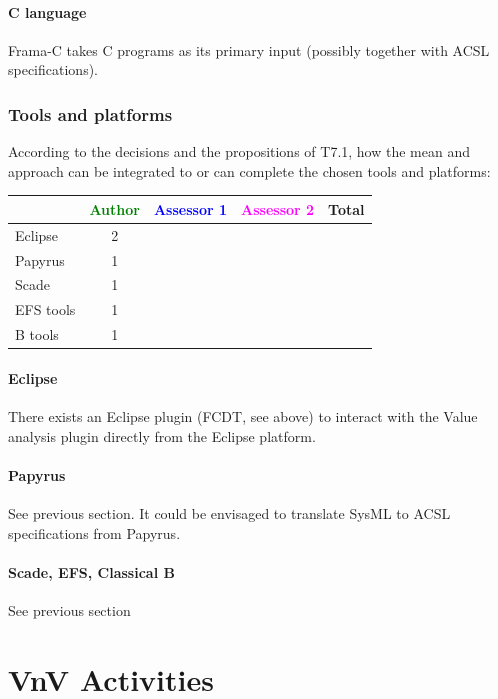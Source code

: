 \paragraph{C language}
Frama-C takes C programs as its primary input (possibly together with
ACSL specifications).

\subsubsection{Tools and platforms}

According to the decisions and the propositions of T7.1, how the mean and approach can be integrated to or can complete the chosen tools and platforms:

\begin{tabular}{|l | c | c | c | c|}
\hline
& \textcolor{green}{Author} & \textcolor{blue}{Assessor 1} & \textcolor{magenta}{Assessor 2} & Total \\
\hline 
Eclipse & 2 & & &  \\
\hline
Papyrus  & 1 & & & \\
\hline
Scade & 1 & & & \\
\hline
EFS tools & 1 & & & \\
\hline
B tools & 1 & & & \\
\hline
\end{tabular}

\paragraph{Eclipse}
There exists an Eclipse plugin (FCDT, see above) to interact with the 
Value analysis plugin directly from the Eclipse platform.

\paragraph{Papyrus}

See previous section. It could be envisaged to translate SysML to ACSL
specifications from Papyrus.

\paragraph{Scade, EFS, Classical B}
See previous section





\section{VnV Activities}

